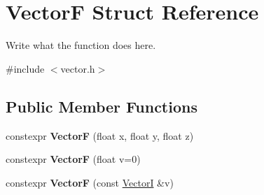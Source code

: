 \hypertarget{structVectorF}{\section{Vector\+F Struct Reference}
\label{structVectorF}
}


Write what the function does here.  




{\ttfamily \#include $<$vector.\+h$>$}

\subsection*{Public Member Functions}
\begin{DoxyCompactItemize}
\item 
\hypertarget{structVectorF_a0f4de0211dcec74e2cf31c3dbc8f6573}{constexpr {\bfseries Vector\+F} (float x, float y, float z)}\label{structVectorF_a0f4de0211dcec74e2cf31c3dbc8f6573}

\item 
\hypertarget{structVectorF_a5bc6c2141ab8c3b26c3b15c3d2188e46}{constexpr {\bfseries Vector\+F} (float v=0)}\label{structVectorF_a5bc6c2141ab8c3b26c3b15c3d2188e46}

\item 
\hypertarget{structVectorF_aa06b752b0c00710c1d6d0c885686b282}{constexpr {\bfseries Vector\+F} (const \hyperlink{structVectorI}{Vector\+I} \&v)}\label{structVectorF_aa06b752b0c00710c1d6d0c885686b282}


\end{DoxyCompactItemize}
